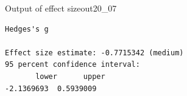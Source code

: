 \begin{Rscreen}{Output of effect size}{out20_07}
	\begin{verbatim}
Hedges's g

Effect size estimate: -0.7715342 (medium)
95 percent confidence interval:
       lower      upper 
-2.1369693  0.5939009 
\end{verbatim}
\end{Rscreen}
